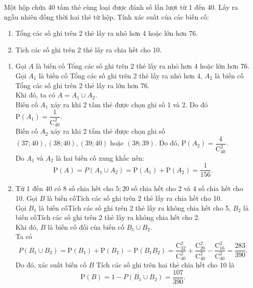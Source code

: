 \begin{baitap}%
	Một hộp chứa 40 tấm thẻ cùng loại được đánh số lần lượt từ 1 đến 40. Lấy ra ngẫu nhiên đồng thời hai thẻ từ hộp. Tính xác suất của các biến cố:
	\begin{enumerate}
		\item \text{\lq\lq}Tổng các số ghi trên 2 thẻ lấy ra nhỏ hơn 4 hoặc lớn hơn 76\text{\rq\rq}.
		\item \text{\lq\lq}Tích các số ghi trên 2 thẻ lấy ra chia hết cho 10\text{\rq\rq}.
	\end{enumerate}
	\loigiai
	{
		\begin{enumerate}
			\item Gọi $A$ là biến cố \text{\lq\lq}Tổng các số ghi trên 2 thẻ lấy ra nhỏ hơn 4 hoặc lớn hơn 76\text{\rq\rq}. Gọi $A_1$ là biến cố \text{\lq\lq}Tổng các số ghi trên 2 thẻ lấy ra nhỏ hơn 4\text{\rq\rq}, $A_2$ là biến cố \text{\lq\lq}Tổng các số ghi trên 2 thẻ lấy ra lớn hơn 76\text{\rq\rq}.\\
			Khi đó, ta có $A=A_1\cup A_2$.\\
			Biến cố $A_1$ xảy ra khi 2 tấm thẻ được chọn ghi số 1 và 2. Do đó $\mathrm{P}(A_1)=\dfrac{1}{\mathrm{C}_{40}^2}$.\\
			Biến cố $A_2$ xảy ra khi 2 tấm thẻ được chọn ghi số $(37;40),(38;40),(39;40)$ hoặc $(38;39)$. Do đó, $\mathrm{P}(A_2)=\dfrac{4}{\mathrm{C}_{40}^2}$.\\
			Do $A_1$ và $A_2$ là hai biến cố xung khắc nên:
			\[\mathrm{P}(A)=P\left(A_1 \cup A_2\right)=\mathrm{P}(A_1)+\mathrm{P}(A_2)=\dfrac{1}{156}.\]
			\item Từ 1 đến 40 có 8 số chia hết cho $5;20$ số chia hết cho 2 và 4 số chia hết cho 10. Gọi $B$ là biến cố\text{\lq\lq}Tích các số ghi trên 2 thẻ lấy ra chia hết cho 10\text{\rq\rq}.\\
			Gọi $B_1$ là biến cố\text{\lq\lq}Tích các số ghi trên 2 thẻ lấy ra không chia hết cho 5\text{\rq\rq}, $B_2$ là biến cố\text{\lq\lq}Tích các số ghi trên 2 thẻ lấy ra không chia hết cho 2\text{\rq\rq}.\\
			Khi đó, $B$ là biến cố đối của biến cố $B_1\cup B_2$.\\
			Ta có 
			\[P\left(B_1 \cup B_2\right)=\mathrm{P}(B_1)+\mathrm{P}(B_2)-\mathrm{P}(B_1 B_2)=\dfrac{ \mathrm{C}_{32}^2}{ \mathrm{C}_{40}^2}+\frac{ \mathrm{C}_{20}^2}{ \mathrm{C}_{40}^2}-\frac{ \mathrm{C}_{16}^2}{ \mathrm{C}_{40}^2}=\dfrac{283}{390}.\]
			Do đó, xác suất biến cố $B$ \text{\lq\lq}Tích các số ghi trên hai thẻ chia hết cho 10\text{\rq\rq} là 
			\[\mathrm{P}(B)=1-P\left(B_1 \cup B_2\right)=\dfrac{107}{390}.\]
			
		\end{enumerate}
	}
\end{baitap} 

